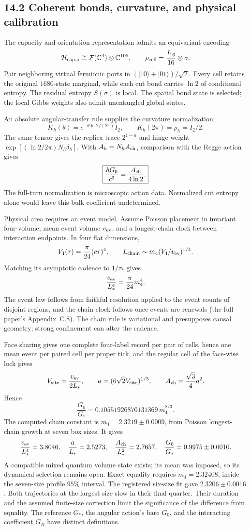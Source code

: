 \documentclass[11pt]{article}
\begin{document}
\subsection{14.2 Coherent bonds, curvature, and physical calibration}

The capacity and orientation representation admits an equivariant
encoding
\[
\mathcal H_{\rm cap,o}\cong\mathcal F(\mathbb C^4)\otimes\mathbb C^{105},
\qquad
\rho_{\rm cell}=\frac{I_{16}}{16}\otimes\sigma.
\]
Pair neighboring virtual fermionic ports in
\((|10\rangle+|01\rangle)/\sqrt2\).
Every cell retains the original \(1680\)-state marginal, while each
cut bond carries \(\ln2\) of conditional entropy. The residual
entropy \(S(\sigma)\) is local. The spatial bond state is selected;
the local Gibbs weights also admit unentangled global states.

An absolute angular-transfer rule supplies the curvature
normalization:
\[
K_h(\theta)=e^{-\theta\ln2/(2\pi)}I_2,\qquad
K_h(2\pi)=\rho_h=I_2/2.
\]
The same tensor gives the replica trace \(2^{1-n}\) and hinge
weight \(\exp[(\ln2/2\pi)N_h\delta_h]\). With
\(A_h=N_hA_{\rm ch}\), comparison with the Regge action gives
\[
\boxed{\frac{\hbar G_0}{c^3}=\frac{A_{\rm ch}}{4\ln2}.}
\]
The full-turn normalization is microscopic action data.
Normalized cut entropy alone would leave this bulk coefficient
undetermined.

Physical area requires an event model. Assume Poisson placement
in invariant four-volume, mean event volume \(v_{\rm ev}\), and
a longest-chain clock between interaction endpoints. In four
flat dimensions,
\[
V_4(\tau)=\frac{\pi}{24}(c\tau)^4,\qquad
L_{\rm chain}\sim m_4(V_4/v_{\rm ev})^{1/4}.
\]
Matching its asymptotic cadence to \(1/\tau_*\) gives
\[
\frac{v_{\rm ev}}{L_*^4}=\frac{\pi}{24}m_4^4.
\]
The event law follows from faithful resolution applied to the event counts of disjoint regions, and the chain clock follows once events are renewals (the full paper's Appendix~C.8).
The chain rule is variational and presupposes causal geometry;
strong confinement can alter the cadence.

Face sharing gives one complete four-label record per pair of cells, hence one mean event per paired cell per proper tick, and the regular cell of the face-wise lock gives
\[
V_{\rm site}=\frac{v_{\rm ev}}{2L_*},\qquad
a=(6\sqrt2V_{\rm site})^{1/3},\qquad
A_{\rm ch}=\frac{\sqrt3}{4}a^2.
\]
Hence
\[
\boxed{\frac{G_0}{G_*}=0.10551926870131369\,m_4^{8/3}.}
\]
The computed chain constant is \(m_4=2.3219\pm0.0009\), from Poisson
longest-chain growth at seven box sizes. It gives
\[
\frac{v_{\rm ev}}{L_*^4}=3.8046,\quad
\frac a{L_*}=2.5273,\quad
\frac{A_{\rm ch}}{L_*^2}=2.7657,\quad
\frac{G_0}{G_*}=0.9975\pm0.0010.
\]
A compatible mixed quantum volume state exists; its mean was
imposed, so its dynamical selection remains open. Exact equality requires \(m_4=2.32408\), inside the seven-size profile \(95\%\) interval. The registered six-size fit gave \(2.3206\pm0.0016\). Both trajectories at the largest size slow in their final quarter. Their duration and the assumed finite-size correction limit the significance of the difference from equality.
The reference \(G_*\), the angular action's bare \(G_0\), and the
interacting coefficient \(G_R\) have distinct definitions.
\end{document}
